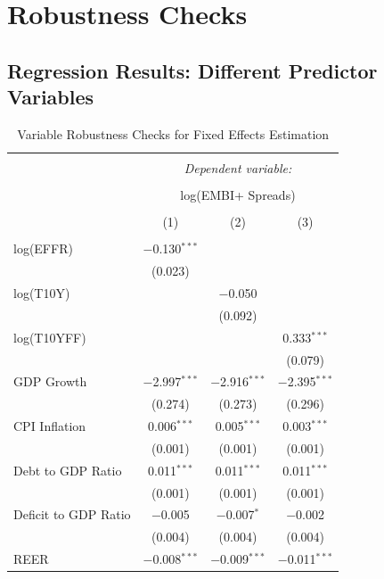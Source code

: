 \documentclass[12pt]{article}
\begin{document}
\section{Robustness Checks}
\subsection{Regression Results: Different Predictor Variables}
\FloatBarrier
\begin{table}[!h] \centering 
  \caption{Variable Robustness Checks for Fixed Effects Estimation} 
  \label{tbl7} 
\tiny 
\begin{tabular}{@{\extracolsep{5pt}}lccc} 
\\[-1.8ex]\hline 
\hline \\[-1.8ex] 
 & \multicolumn{3}{c}{\textit{Dependent variable:}} \\ 
\cline{2-4} 
\\[-1.8ex] & \multicolumn{3}{c}{log(EMBI+ Spreads)} \\ 
\\[-1.8ex] & (1) & (2) & (3)\\ 
\hline \\[-1.8ex] 
 log(EFFR) & $-$0.130$^{***}$ &  &  \\ 
  & (0.023) &  &  \\ 
  log(T10Y) &  & $-$0.050 &  \\ 
  &  & (0.092) &  \\ 
  log(T10YFF) &  &  & 0.333$^{***}$ \\ 
  &  &  & (0.079) \\ 
  GDP Growth & $-$2.997$^{***}$ & $-$2.916$^{***}$ & $-$2.395$^{***}$ \\ 
  & (0.274) & (0.273) & (0.296) \\ 
  CPI Inflation & 0.006$^{***}$ & 0.005$^{***}$ & 0.003$^{***}$ \\ 
  & (0.001) & (0.001) & (0.001) \\ 
  Debt to GDP Ratio & 0.011$^{***}$ & 0.011$^{***}$ & 0.011$^{***}$ \\ 
  & (0.001) & (0.001) & (0.001) \\ 
  Deficit to GDP Ratio & $-$0.005 & $-$0.007$^{*}$ & $-$0.002 \\ 
  & (0.004) & (0.004) & (0.004) \\ 
  REER & $-$0.008$^{***}$ & $-$0.009$^{***}$ & $-$0.011$^{***}$ \\ 

\end{tabular}
\end{table}
\end{document}
